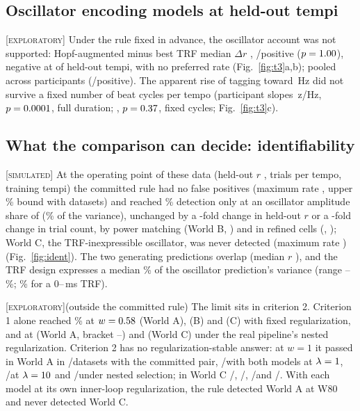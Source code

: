 \documentclass[journal]{IEEEtran}
\newcommand{\Expl}{\textsc{[exploratory]}\xspace}
\newcommand{\Simul}{\textsc{[simulated]}\xspace}
\begin{document}
\subsection{Oscillator encoding models at held-out tempi}
\Expl Under the rule fixed in advance, the oscillator account was not supported: Hopf-augmented minus best TRF median $\Delta r$ \NumTThreeDelta, \NumTThreePos/\NumNTwo positive ($p=1.00$), negative at \NumTThreeNegTempi of \NumNTempi held-out tempi, with no preferred rate (Fig.~\ref{fig:t3}a,b); pooled across participants \NumGroupDelta (\NumGroupPos/\NumNTwo positive). The apparent rise of tagging toward \NumTempoRise\,Hz did not survive a fixed number of beat cycles per tempo (participant slopes \NumSlopeLFull\,z/Hz, $p=0.0001$, full duration; \NumSlopeLFixed, $p=0.37$, fixed cycles; Fig.~\ref{fig:t3}c).

\subsection{What the comparison can decide: identifiability}
\Simul At the operating point of these data (held-out $r$ \NumOpR, \NumOpTrials trials per tempo, \NumOpTempi training tempi) the committed rule had no false positives (maximum rate \NumFpMax, upper \NumCiPct\% bound \NumFpHi with \NumNDatasets datasets) and reached \NumPowerPct\% detection only at an oscillator amplitude share of \NumWA (\NumWAVar\% of the variance), unchanged by a \NumSnrFactor-fold change in held-out $r$ or a \NumTrialsFactor-fold change in trial count, by power matching (World B, \NumWB) and in refined cells (\NumWRefOne, \NumWRefTwo); World C, the TRF-inexpressible oscillator, was never detected (maximum rate \NumCMax) (Fig.~\ref{fig:ident}). The two generating predictions overlap (median $r$ \NumOverlap), and the TRF design expresses a median \NumRTwoShort\% of the oscillator prediction's variance (range \NumRTwoShortMin--\NumRTwoShortMax\%; \NumRTwoLong\% for a 0--\NumLongTrf\,ms TRF).

\Expl (outside the committed rule) The limit sits in criterion 2. Criterion 1 alone reached \NumPowerPct\% at $w=0.58$ (World A), \NumCritOneB (B) and \NumCritOneC (C) with fixed regularization, and at \NumCritOneNestedA (World A, bracket \NumCritOneNestedALo--\NumCritOneNestedAHi) and \NumCritOneNestedCText (World C) under the real pipeline's nested regularization. Criterion 2 has no regularization-stable answer: at $w=1$ it passed in World A in \NumCritTwoACommitted/\NumCritTwoACommittedN datasets with the committed pair, \NumCritTwoAOne/\NumLampairDatasets with both models at $\lambda=1$, \NumCritTwoATen/\NumLampairDatasets at $\lambda=10$ and \NumCritTwoANested/\NumCritTwoANestedN under nested selection; in World C \NumCritTwoCCommitted/\NumCritTwoCCommittedN, \NumCritTwoCOne/\NumLampairDatasets, \NumCritTwoCTen/\NumLampairDatasets and \NumCritTwoCNested/\NumCritTwoCNestedN. With each model at its own inner-loop regularization, the rule detected World A at W80 \NumWNested and never detected World C.
\end{document}
